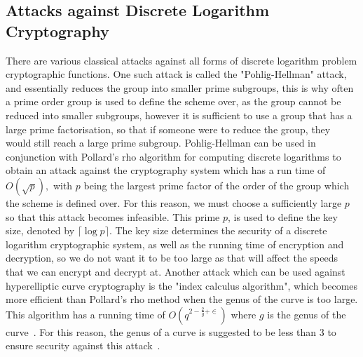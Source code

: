 \subsection{Attacks against Discrete Logarithm Cryptography}
There are various classical attacks against all forms of discrete logarithm problem cryptographic functions. One such attack is called the "Pohlig-Hellman" attack, and essentially reduces the group into smaller prime subgroups, this is why often a prime order group is used to define the scheme over, as the group cannot be reduced into smaller subgroups, however it is sufficient to use a group that has a large prime factorisation, so that if someone were to reduce the group, they would still reach a large prime subgroup. Pohlig-Hellman can be used in conjunction with Pollard's rho algorithm for computing discrete logarithms to obtain an attack against the cryptography system which has a run time of $\textit{O}(\sqrt{p}),$ with $p$ being the largest prime factor of the order of the group which the scheme is defined over. For this reason, we must choose a sufficiently large $p$ so that this attack becomes infeasible. This prime $p$, is used to define the key size, denoted by $\lceil \log p \rceil $. The key size determines the security of a discrete logarithm cryptographic system, as well as the running time of encryption and decryption, so we do not want it to be too large as that will affect the speeds that we can encrypt and decrypt at. Another attack which can be used against hyperelliptic curve cryptography is the "index calculus algorithm", which becomes more efficient than Pollard's rho method when the genus of the curve is too large. This algorithm has a running time of $\textit{O}(q^{2-\frac{2}{g}+\in})$ where $g$ is the genus of the curve~\cite{theriault2003index}. For this reason, the genus of a curve is suggested to be less than 3 to ensure security against this attack~\cite{scholten2003introduction}.